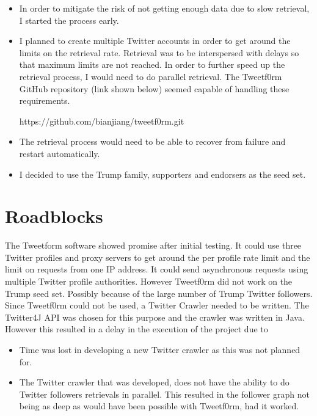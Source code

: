\documentclass{sig-alternate-05-2015}
\begin{document}
\begin{itemize}

\item In order to mitigate the risk of not getting enough data due to slow retrieval, I started the process early.

\item I planned to create multiple Twitter accounts in order to get around the limits on the retrieval rate. Retrieval was to be interspersed with delays so that maximum limits are not reached. In order to further speed up the retrieval process, I would need to do parallel retrieval. The Tweetf0rm GitHub repository (link shown below) seemed capable of handling these requirements.

https://github.com/bianjiang/tweetf0rm.git

\item The retrieval process would need to be able to recover from failure and restart automatically.

\item I decided to use the Trump family, supporters and endorsers as the seed set.

\end{itemize}

\section{Roadblocks}

The Tweetform software showed promise after initial testing. It could use three Twitter profiles and proxy servers to get around the per profile rate limit and the limit on requests from one IP address. It could send asynchronous requests using multiple Twitter profile authorities. However Tweetf0rm did not work on the Trump seed set. Possibly because of the large number of Trump Twitter followers.\\

Since Tweetf0rm could not be used, a Twitter Crawler needed to be written. The Twitter4J API was chosen for this purpose and the crawler was written in Java.\\

However this resulted in a delay in the execution of the project due to 
\begin{itemize}

\item Time was lost in developing a new Twitter crawler as this was not planned for.

\item The Twitter crawler that was developed, does not have the ability to do Twitter followers retrievals in parallel. This resulted in the follower graph not being as deep as would have been possible with Tweetf0rm, had it worked.

\end{itemize}
\end{document}
